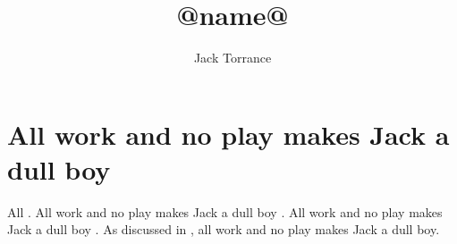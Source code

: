 \documentclass{article}
\title{@name@}
\author{Jack Torrance}
\begin{document}
\maketitle

\section{All work and no play makes Jack a dull boy}

All \citep{Griewank1989}.
All work and no play makes Jack a dull boy \citep{Brenguier2008, Veen2008}.
All work and no play makes Jack a dull boy \citep{Jack1980}.
As discussed in \citet{Boyd2004}, all work and no play makes Jack a dull boy.



\end{document}
